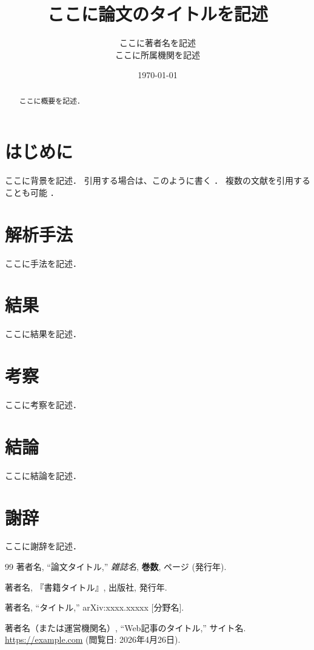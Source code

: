 \documentclass[11pt, a4paper]{ltjsarticle}
\title{ここに論文のタイトルを記述}
\author{ここに著者名を記述 \\ ここに所属機関を記述}
\date{\today}
\begin{document}
\maketitle

\begin{abstract}
ここに概要を記述．
\end{abstract}

\section{はじめに}
ここに背景を記述．
引用する場合は、このように書く \cite{ref:paper1}．
複数の文献を引用することも可能 \cite{ref:book1, ref:arxiv1}．

\section{解析手法}
ここに手法を記述．

\section{結果}
ここに結果を記述．

\section{考察}
ここに考察を記述．

\section{結論}
ここに結論を記述．

\section*{謝辞}
ここに謝辞を記述．

\begin{thebibliography}{99}
  著者名, ``論文タイトル,'' \textit{雑誌名}, \textbf{巻数}, ページ (発行年).

  著者名, 『書籍タイトル』, 出版社, 発行年.

  著者名, ``タイトル,'' arXiv:xxxx.xxxxx [分野名].

  著者名（または運営機関名）, ``Web記事のタイトル,'' サイト名. \url{https://example.com} (閲覧日: 2026年4月26日).
\end{thebibliography}
\end{document}
